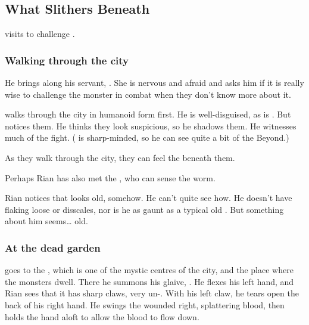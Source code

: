  






\subsection{What Slithers Beneath}
 visits \Malcur to challenge .





\subsubsection{Walking through the city}
He brings along his servant, . She is nervous and afraid and asks him if it is really wise to challenge the monster in combat when they don't know more about it.

\Ishnaruchaefir{} walks through the city in humanoid form first. He is well-disguised, as is \Criseis. But  notices them. He thinks they look suspicious, so he shadows them. He witnesses much of the fight. ( is sharp-minded, so he can see quite a bit of the Beyond.)

As they walk through the city, they can feel the \noggyaleth{} beneath them. 


Perhaps Rian has also met the , who can sense the \noggyal{} worm.

Rian notices that \Ishnaruchaefir{} looks old, somehow. 
He can't quite see how. 
He doesn't have flaking loose or dis\coloured scales, nor is he as gaunt as a typical old \scatha. 
But something about him seems\ldots{} old. 





\subsubsection{At the dead garden}
\Ishnaruchaefir{} goes to the , which is one of the mystic centres of the city, and the place where the monsters dwell. There he summons his glaive, \Triestessakhin. He flexes his left hand, and Rian sees that it has sharp claws, very un-\scathaese. With his left claw, he tears open the back of his right hand. He swings the wounded right, splattering blood, then holds the hand aloft to allow the blood to flow down. 

